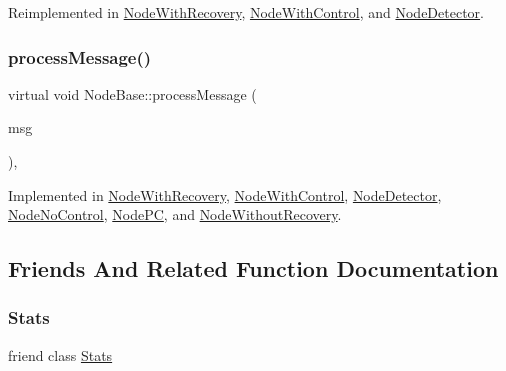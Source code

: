 Reimplemented in \hyperlink{class_node_with_recovery_a33d8e8775fd69cb647b38a54b36e1ebe}{Node\+With\+Recovery}, \hyperlink{class_node_with_control_ab871014cf3f42d834f8d34ad5498174c}{Node\+With\+Control}, and \hyperlink{class_node_detector_af75cf37cc01fc51bc228a7a83c10cb97}{Node\+Detector}.

\mbox{\label{class_node_base_ae70b168f2bc7407c249594b1c614301c}} 
\subsubsection{\texorpdfstring{process\+Message()}{processMessage()}}
{\footnotesize\ttfamily virtual void Node\+Base\+::process\+Message (\begin{DoxyParamCaption}\item[{c\+Message $\ast$}]{msg }\end{DoxyParamCaption})\hspace{0.3cm}{\ttfamily [protected]}, {}}



Implemented in \hyperlink{class_node_with_recovery_a216c29d76ddb0e94cd5701ff208c7f5b}{Node\+With\+Recovery}, \hyperlink{class_node_with_control_af532082fab76c38d8c50ca90e991f4c3}{Node\+With\+Control}, \hyperlink{class_node_detector_ab69432c6d3327a684845ec231826727e}{Node\+Detector}, \hyperlink{class_node_no_control_aa83bc408fe3dab03f124ea5489946836}{Node\+No\+Control}, \hyperlink{class_node_p_c_aa5fedc4136104a06e2f1131f1ba16b0e}{Node\+PC}, and \hyperlink{class_node_without_recovery_a0b44132b4ebc650399711766cb050399}{Node\+Without\+Recovery}.



\subsection{Friends And Related Function Documentation}
\mbox{\label{class_node_base_a129f65b6976377739eb6231b6962985e}} 
\subsubsection{\texorpdfstring{Stats}{Stats}}
{\footnotesize\ttfamily friend class \hyperlink{class_stats}{Stats}\hspace{0.3cm}{\ttfamily [friend]}}



